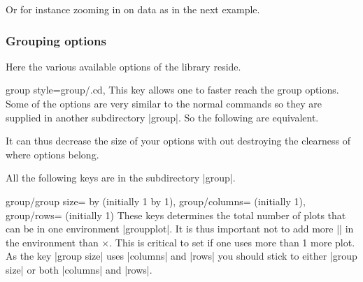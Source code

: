 \begin{command}{\nextgroupplot{} }
Or for instance zooming in on data as in the next example.
\begin{codeexample}[]
\end{codeexample}
\end{command}


\subsubsection{Grouping options}
\label{sec:pgfplots:group:options}

Here the various available options of the library reside. 

\begin{pgfplotskey}{group style=group/.cd,}
  This key allows one to faster reach the group options. Some of the options are very similar to the normal commands so they are supplied in another
  subdirectory |group|. So the following are equivalent.
\begin{codeexample}
\pgfplotsset{group/a=2,group/b=3}
\pgfplotsset{group/.cd,a=2,b=3}
\end{codeexample}
It can thus decrease the size of your options with out destroying the clearness of where options belong.
\end{pgfplotskey}
All the following keys are in the subdirectory |group|.

\begin{pgfplotskeylist}{group/group size= by  (initially 1 by 1),
      group/columns= (initially 1),
      group/rows= (initially 1)}
  These keys determines the total number of plots that can be in one environment |groupplot|. It is thus important not to add more
  |\nextgroupplot| in the environment than $\times$. This is critical to set if one uses more than 1 more plot. As
  the key |group size| uses |columns| and |rows| you should stick to either |group size| or both |columns| and |rows|.
\end{pgfplotskeylist}

